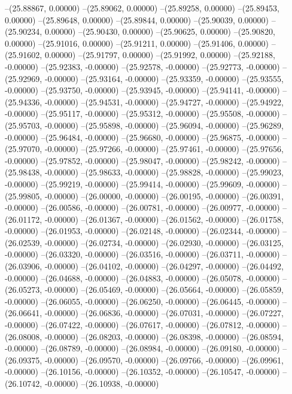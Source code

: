--(25.88867, 0.00000)
--(25.89062, 0.00000)
--(25.89258, 0.00000)
--(25.89453, 0.00000)
--(25.89648, 0.00000)
--(25.89844, 0.00000)
--(25.90039, 0.00000)
--(25.90234, 0.00000)
--(25.90430, 0.00000)
--(25.90625, 0.00000)
--(25.90820, 0.00000)
--(25.91016, 0.00000)
--(25.91211, 0.00000)
--(25.91406, 0.00000)
--(25.91602, 0.00000)
--(25.91797, 0.00000)
--(25.91992, 0.00000)
--(25.92188, -0.00000)
--(25.92383, -0.00000)
--(25.92578, -0.00000)
--(25.92773, -0.00000)
--(25.92969, -0.00000)
--(25.93164, -0.00000)
--(25.93359, -0.00000)
--(25.93555, -0.00000)
--(25.93750, -0.00000)
--(25.93945, -0.00000)
--(25.94141, -0.00000)
--(25.94336, -0.00000)
--(25.94531, -0.00000)
--(25.94727, -0.00000)
--(25.94922, -0.00000)
--(25.95117, -0.00000)
--(25.95312, -0.00000)
--(25.95508, -0.00000)
--(25.95703, -0.00000)
--(25.95898, -0.00000)
--(25.96094, -0.00000)
--(25.96289, -0.00000)
--(25.96484, -0.00000)
--(25.96680, -0.00000)
--(25.96875, -0.00000)
--(25.97070, -0.00000)
--(25.97266, -0.00000)
--(25.97461, -0.00000)
--(25.97656, -0.00000)
--(25.97852, -0.00000)
--(25.98047, -0.00000)
--(25.98242, -0.00000)
--(25.98438, -0.00000)
--(25.98633, -0.00000)
--(25.98828, -0.00000)
--(25.99023, -0.00000)
--(25.99219, -0.00000)
--(25.99414, -0.00000)
--(25.99609, -0.00000)
--(25.99805, -0.00000)
--(26.00000, -0.00000)
--(26.00195, -0.00000)
--(26.00391, -0.00000)
--(26.00586, -0.00000)
--(26.00781, -0.00000)
--(26.00977, -0.00000)
--(26.01172, -0.00000)
--(26.01367, -0.00000)
--(26.01562, -0.00000)
--(26.01758, -0.00000)
--(26.01953, -0.00000)
--(26.02148, -0.00000)
--(26.02344, -0.00000)
--(26.02539, -0.00000)
--(26.02734, -0.00000)
--(26.02930, -0.00000)
--(26.03125, -0.00000)
--(26.03320, -0.00000)
--(26.03516, -0.00000)
--(26.03711, -0.00000)
--(26.03906, -0.00000)
--(26.04102, -0.00000)
--(26.04297, -0.00000)
--(26.04492, -0.00000)
--(26.04688, -0.00000)
--(26.04883, -0.00000)
--(26.05078, -0.00000)
--(26.05273, -0.00000)
--(26.05469, -0.00000)
--(26.05664, -0.00000)
--(26.05859, -0.00000)
--(26.06055, -0.00000)
--(26.06250, -0.00000)
--(26.06445, -0.00000)
--(26.06641, -0.00000)
--(26.06836, -0.00000)
--(26.07031, -0.00000)
--(26.07227, -0.00000)
--(26.07422, -0.00000)
--(26.07617, -0.00000)
--(26.07812, -0.00000)
--(26.08008, -0.00000)
--(26.08203, -0.00000)
--(26.08398, -0.00000)
--(26.08594, -0.00000)
--(26.08789, -0.00000)
--(26.08984, -0.00000)
--(26.09180, -0.00000)
--(26.09375, -0.00000)
--(26.09570, -0.00000)
--(26.09766, -0.00000)
--(26.09961, -0.00000)
--(26.10156, -0.00000)
--(26.10352, -0.00000)
--(26.10547, -0.00000)
--(26.10742, -0.00000)
--(26.10938, -0.00000)
